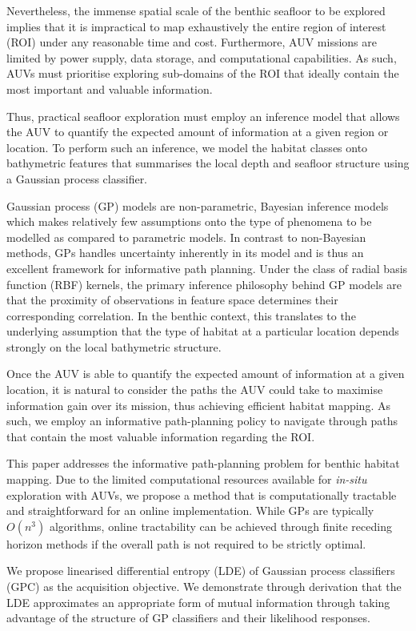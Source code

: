 \documentclass{article}
\begin{document}
	Nevertheless, the immense spatial scale of the benthic seafloor to be explored implies that it is impractical to map exhaustively the entire region of interest (ROI) under any reasonable time and cost. Furthermore, AUV missions are limited by power supply, data storage, and computational capabilities. As such, AUVs must prioritise exploring sub-domains of the ROI that ideally contain the most important and valuable information.
	
	Thus, practical seafloor exploration must employ an inference model that allows the AUV to quantify the expected amount of information at a given region or location. To perform such an inference, we model the habitat classes onto bathymetric features that summarises the local depth and seafloor structure using a Gaussian process classifier.

	Gaussian process (GP) models are non-parametric, Bayesian inference models which makes relatively few assumptions onto the type of phenomena to be modelled as compared to parametric models. In contrast to non-Bayesian methods, GPs handles uncertainty inherently in its model and is thus an excellent framework for informative path planning. Under the class of radial basis function (RBF) kernels, the primary inference philosophy behind GP models are that the proximity of observations in feature space determines their corresponding correlation. In the benthic context, this translates to the underlying assumption that the type of habitat at a particular location depends strongly on the local bathymetric structure.
		
	Once the AUV is able to quantify the expected amount of information at a given location, it is natural to consider the paths the AUV could take to maximise information gain over its mission, thus achieving efficient habitat mapping. As such, we employ an informative path-planning policy to navigate through paths that contain the most valuable information regarding the ROI. 
	
	This paper addresses the informative path-planning problem for benthic habitat mapping. Due to the limited computational resources available for \textit{in-situ} exploration with AUVs, we propose a method that is computationally tractable and straightforward for an online implementation. While GPs are typically $O(n^{3})$ algorithms, online tractability can be achieved through finite receding horizon methods if the overall path is not required to be strictly optimal.
	
	We propose linearised differential entropy (LDE) of Gaussian process classifiers (GPC) as the acquisition objective. We demonstrate through derivation that the LDE approximates an appropriate form of mutual information through taking advantage of the structure of GP classifiers and their likelihood responses.
	
\end{document}
